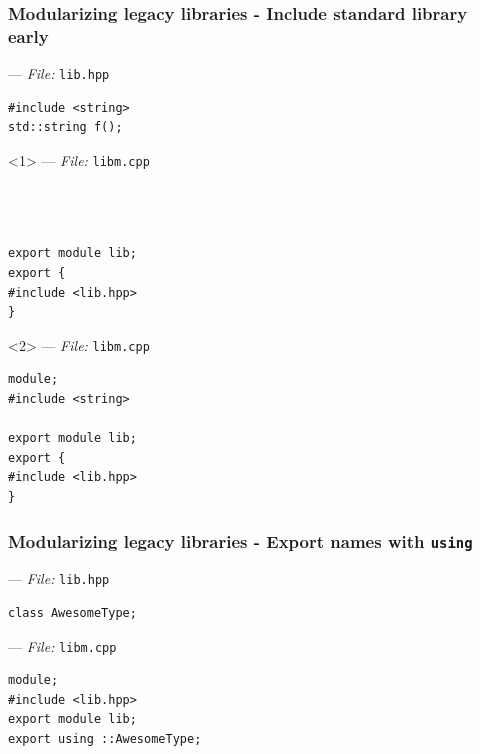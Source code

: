 \documentclass[aspectratio=169]{beamer}
\begin{document}
\begin{frame}[fragile]
  \frametitle{Modularizing legacy libraries - Include standard library early}
  --- \textit{File:} \texttt{lib.hpp}
  \begin{lstlisting}[style=cpp20]
#include <string>
std::string f();
  \end{lstlisting}

  \begin{onlyenv}<1>
  --- \textit{File:} \texttt{libm.cpp}
  \begin{lstlisting}[style=cpp20]



export module lib;
export {
#include <lib.hpp>
}
  \end{lstlisting}
  \end{onlyenv}

  \begin{onlyenv}<2>
  --- \textit{File:} \texttt{libm.cpp}
  \begin{lstlisting}[style=cpp20]
module;
#include <string>

export module lib;
export {
#include <lib.hpp>
}
  \end{lstlisting}
  \end{onlyenv}

\end{frame}

\begin{frame}[fragile]
  \frametitle{Modularizing legacy libraries - Export names with \texttt{using}}

  --- \textit{File:} \texttt{lib.hpp}
  \begin{lstlisting}[style=cpp20]
class AwesomeType;
  \end{lstlisting}
  --- \textit{File:} \texttt{libm.cpp}
  \begin{lstlisting}[style=cpp20]
module;
#include <lib.hpp>
export module lib;
export using ::AwesomeType;
  \end{lstlisting}

\end{frame}
\end{document}
